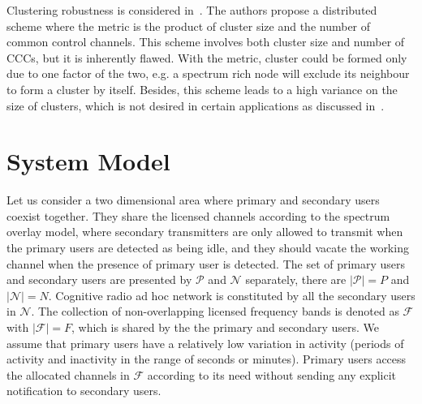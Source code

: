\documentclass[10pt,journal,compsoc]{IEEEtran}
\theoremstyle{mytheoremstyle}
\theoremstyle{mytheoremstyle}
\theoremstyle{mytheoremstyle}
\begin{document}
Clustering robustness is considered in~\cite{Lazos09, LIU_TMC11_2}.
The authors propose a distributed scheme where the metric is the product of cluster size and the number of common control channels.
This scheme involves both cluster size and number of CCCs, but it is inherently flawed.
With the metric, cluster could be formed only due to one factor of the two, e.g. a spectrum rich node will exclude its neighbour to form a cluster by itself.
Besides, this scheme leads to a high variance on the size of clusters, which is not desired in certain applications as discussed in~\cite{clustering_globecom11, cluster_EW10}.



\section{System Model}
\label{sec:model}
Let us consider a two dimensional area where primary and secondary users coexist together.
They share the licensed channels according to the spectrum overlay model, where secondary transmitters are only allowed to transmit when the primary users are detected as being idle, and they should vacate the working channel when the presence of primary user is detected.
The set of primary users and secondary users are presented by $\mathcal{P}$ and $\mathcal{N}$ separately, there are $|\mathcal{P}| = P$ and $|\mathcal{N}| = N$.
Cognitive radio ad hoc network is constituted by all the secondary users in $\mathcal{N}$.
The collection of non-overlapping licensed frequency bands is denoted as $\mathcal{F}$ with $|\mathcal{F}| =F$, which is shared by the the primary and secondary users.
We assume that primary users have a relatively low variation in activity (periods of activity and inactivity in the range of seconds or minutes).
%
Primary users access the allocated channels in $\mathcal{F}$ according to its need without sending any explicit notification to secondary users.
\end{document}

